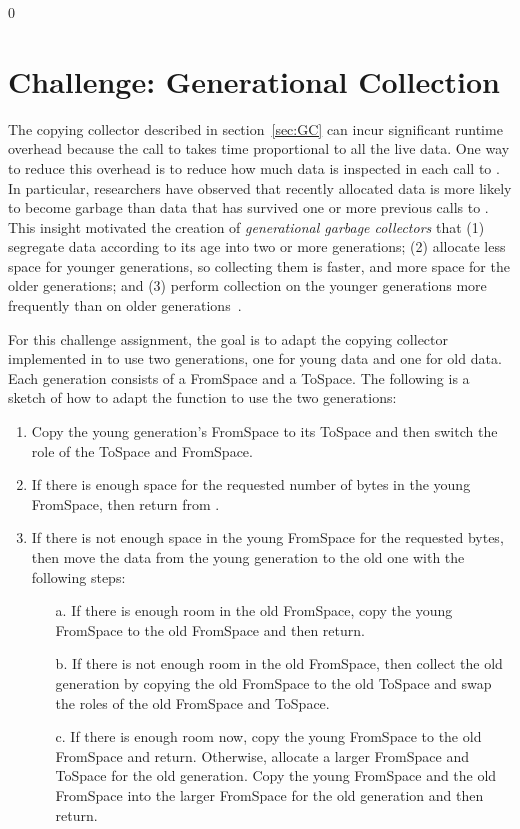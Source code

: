 \documentclass[7x10]{TimesAPriori_MIT}%
\def\racketEd{0}
\def\edition{1}
\numberwithin{theorem}{chapter}
\numberwithin{definition}{chapter}
\numberwithin{equation}{chapter}
\begin{document}
{\if\edition\racketEd
\section{Challenge: Generational Collection}

The copying collector described in section~\ref{sec:GC} can incur
significant runtime overhead because the call to  takes
time proportional to all the live data. One way to reduce this
overhead is to reduce how much data is inspected in each call to
. In particular, researchers have observed that recently
allocated data is more likely to become garbage than data that has
survived one or more previous calls to . This insight
motivated the creation of \emph{generational garbage collectors}
 that
(1) segregate data according to its age into two or more generations;
(2) allocate less space for younger generations, so collecting them is
faster, and more space for the older generations; and (3) perform
collection on the younger generations more frequently than on older
generations~\citep{Wilson:1992fk}.

For this challenge assignment, the goal is to adapt the copying
collector implemented in  to use two generations, one
for young data and one for old data. Each generation consists of a
FromSpace and a ToSpace. The following is a sketch of how to adapt the
 function to use the two generations:

\begin{enumerate}
\item Copy the young generation's FromSpace to its ToSpace and then
  switch the role of the ToSpace and FromSpace.
\item If there is enough space for the requested number of bytes in
  the young FromSpace, then return from .
\item If there is not enough space in the young FromSpace for the
  requested bytes, then move the data from the young generation to the
  old one with the following steps:
  \begin{enumerate}
  \item[a.] If there is enough room in the old FromSpace, copy the young
    FromSpace to the old FromSpace and then return.
  \item[b.] If there is not enough room in the old FromSpace, then collect
    the old generation by copying the old FromSpace to the old ToSpace
    and swap the roles of the old FromSpace and ToSpace.
  \item[c.] If there is enough room now, copy the young FromSpace to the
    old FromSpace and return. Otherwise, allocate a larger FromSpace
    and ToSpace for the old generation.  Copy the young FromSpace and
    the old FromSpace into the larger FromSpace for the old
    generation and then return.
  \end{enumerate}
\end{enumerate}

}
\end{document}
